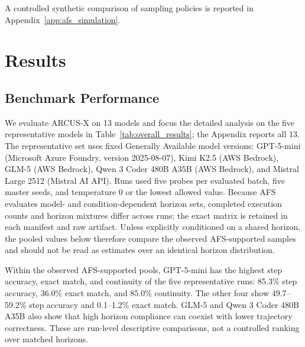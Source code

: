 \documentclass{article}
\begin{document}
A controlled synthetic comparison of sampling policies is reported in Appendix~\ref{app:afs_simulation}.
\section{Results}

\subsection{Benchmark Performance}
We evaluate ARCUS-X on 13 models and focus the detailed analysis on the five representative models in Table~\ref{tab:overall_results}; the Appendix reports all 13. The representative set uses fixed Generally Available model versions: GPT-5-mini (Microsoft Azure Foundry, version 2025-08-07), Kimi K2.5 (AWS Bedrock), GLM-5 (AWS Bedrock), Qwen 3 Coder 480B A35B (AWS Bedrock), and Mistral Large 2512 (Mistral AI API). Runs used five probes per evaluated batch, five master seeds, and temperature 0 or the lowest allowed value. Because AFS evaluates model- and condition-dependent horizon sets, completed execution counts and horizon mixtures differ across runs; the exact matrix is retained in each manifest and raw artifact. Unless explicitly conditioned on a shared horizon, the pooled values below therefore compare the observed AFS-supported samples and should not be read as estimates over an identical horizon distribution.
\begin{table}[!ht]
\centering
\caption{Overall ARCUS-X trajectory-level performance over all recorded non-calibration probes. Exact Match uses the requested $z$ coordinates and all completed probes; taxonomy \emph{None} uses the same exact-match condition among valid responses. Asterisks indicate response validity below 75\%. Validity denotes the proportion of probes yielding cognitively analyzable responses.}
\label{tab:overall_results}
\scriptsize
{}
\end{table}
Within the observed AFS-supported pools, GPT-5-mini has the highest step accuracy, exact match, and continuity of the five representative runs: 85.3\% step accuracy, 36.0\% exact match, and 85.0\% continuity. The other four show 49.7--59.2\% step accuracy and 0.1--1.2\% exact match. GLM-5 and Qwen 3 Coder 480B A35B also show that high horizon compliance can coexist with lower trajectory correctness. These are run-level descriptive comparisons, not a controlled ranking over matched horizons.
\end{document}
